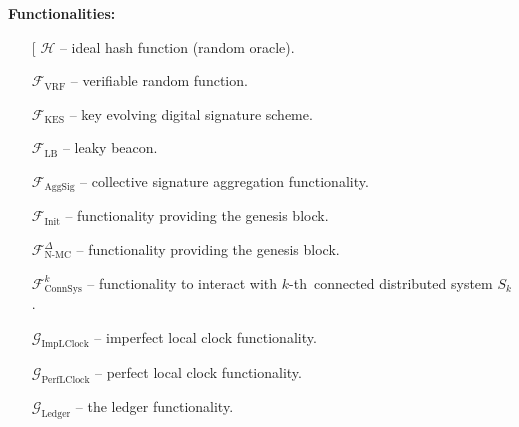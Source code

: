 \textbf{Functionalities:}
\begin{itemize}
    \item[\fontencoding[\ding{113}] $\mathcal{H}$ -- ideal hash function (random oracle).
    \item[\ding{113}] $\mathcal{F}_{\text{VRF}}$ -- verifiable random function.
    \item[\ding{113}] $\mathcal{F}_{\text{KES}}$ -- key evolving digital signature scheme.
    \item[\ding{113}] $\mathcal{F}_{\text{LB}}$ -- leaky beacon.
    \item[\ding{113}] $\mathcal{F}_{\text{AggSig}}$ -- collective signature aggregation functionality.
    \item[\ding{113}] $\mathcal{F}_{\text{Init}}$ -- functionality providing the genesis block.
    \item[\ding{113}] $\mathcal{F}^{\Delta}_{\text{N-MC}}$ -- functionality providing the genesis block.
    \item[\ding{113}] $\mathcal{F}^k_{\text{ConnSys}}$ -- functionality to interact with $k$-th\
    connected distributed system $S_k$.
    \item[\ding{113}] $\mathcal{G}_{\text{ImpLClock}}$ -- imperfect local clock functionality.
    \item[\ding{113}] $\mathcal{G}_{\text{PerfLClock}}$ -- perfect local clock functionality.
    \item[\ding{113}] $\mathcal{G}_{\text{Ledger}}$ -- the ledger functionality.

\end{itemize}
\bigbreak

